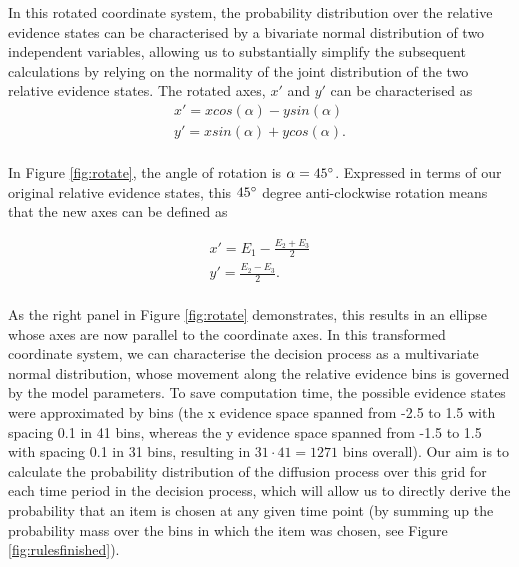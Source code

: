 \documentclass[11pt,a4paper]{article}
\begin{document}
In this rotated coordinate system, the probability distribution over the relative evidence states can be characterised by a bivariate normal distribution of two independent variables, allowing us to substantially simplify the subsequent calculations by relying on the normality of the joint distribution of the two relative evidence states. The rotated axes, $x'$ and $y'$ can be characterised \cite{algebra} as
\begin{equation}
\begin{array}{l}
\displaystyle x' = x cos(\alpha) - y sin(\alpha)\\
\displaystyle y' = x sin(\alpha) + y cos(\alpha).\\
\end{array} 
\label{eq:axes2}
\end{equation}

In Figure \ref{fig:rotate}, the angle of rotation is $\alpha = 45\degree$. Expressed in terms of our original relative evidence states, this $45\degree$ degree anti-clockwise rotation means that the new axes can be defined as

\begin{equation}
\begin{array}{l}
\displaystyle x' = E_{1}-\frac{E_{2}+E_{3}}{2}\\
\displaystyle y' = \frac{E_{2}-E_{3}}{2}.\\
\end{array} 
\label{eq:axes1}
\end{equation}
 
As the right panel in Figure \ref{fig:rotate} demonstrates, this results in an ellipse whose axes are now parallel to the coordinate axes. In this transformed coordinate system, we can characterise the decision process as a multivariate normal distribution, whose movement along the relative evidence bins is governed by the model parameters. To save computation time, the possible evidence states were approximated by bins (the x evidence space spanned from -2.5 to 1.5 with spacing 0.1 in 41 bins, whereas the y evidence space spanned from -1.5 to 1.5 with spacing 0.1 in 31 bins, resulting in $31\cdot41 = 1271$ bins overall). Our aim is to calculate the probability distribution of the diffusion process over this grid for each time period in the decision process, which will allow us to directly derive the probability that an item is chosen at any given time point (by summing up the probability mass over the bins in which the item was chosen, see Figure \ref{fig:rulesfinished}).
\end{document}
